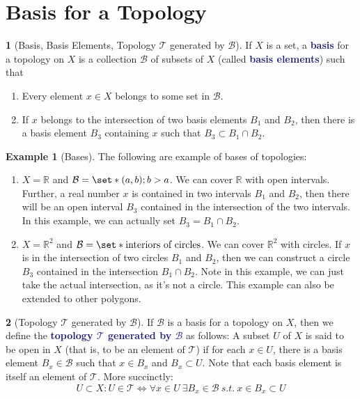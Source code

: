 \documentclass[11pt]{article}
\numberwithin{equation}{section}
\newcommand{\navy}[1]{\textcolor{MidnightBlue}{\bf #1}}
\theoremstyle{plain}
\theoremstyle{definition}
\newtheorem{definition}{\color{MidnightBlue}{\textbf{Definition}}}[section]
\newtheorem{example}{\color{WildStrawberry}Example}[section]
\def\Set{\set*}%
\def\ss{\subset}
\newcommand{\1}{\mathbbm 1}
\newcommand{\RR}{\mathbb R}
\newcommand{\tT}{\mathcal T}
\newcommand{\bB}{\mathcal B}
\begin{document}
\section{Basis for a Topology}

\begin{definition}[Basis, Basis Elements, Topology $\tT$ generated by $\bB$]
	If $X$ is a set, a \navy{basis} for a topology on $X$ is a collection $\bB$ of subsets of $X$ (called \navy{basis elements}) such that
	\begin{enumerate}
		\item Every element $x \in X$ belongs to some set in $\bB$. 
		\item If $x$ belongs to the intersection of two basis elements $B_1$ and $B_2$, then there is a basis element $B_3$ containing $x$ such that $B_3 \subset B_1 \cap B_2$.
	\end{enumerate}
\end{definition}

\begin{example}[Bases] The following are example of bases of topologies:
	\begin{enumerate}
		\item $X = \RR$ and $\bB = \Set{(a,b);b>a}$. We can cover $\RR$ with open intervals. Further, a real number $x$ is contained in two intervals $B_1$ and $B_2$, then there will be an open interval $B_3$ contained in the intersection of the two intervals. In this example, we can actually set $B_3 = B_1 \cap B_2$. 
		\item $X = \RR^2$ and $\bB = \Set{\text{interiors of circles}}$. We can cover $\RR^2$ with circles. If $x$ is in the intersection of two circles $B_1$ and $B_2$, then we can construct a circle $B_3$ contained in the intersection $B_1 \cap B_2$. Note in this example, we can just take the actual intersection, as it's not a circle. This example can also be extended to other polygons. 
	\end{enumerate}
\end{example}


\begin{definition}[Topology $\tT$ generated by $\bB$]
	If $\bB$ is a basis for a topology on $X$, then we define the \navy{topology $\tT$ generated by $\bB$} as follows: A subset $U$ of $X$ is said to be open in $X$ (that is, to be an element of $\tT$) if for each $x \in U$, there is a basis element $B_x \in \bB$ such that $x \in B_x$ and $B_x \subset U$. Note that each basis element is itself an element of $\tT$. More succinctly:
	\begin{equation*}
		U \ss X: U \in \tT \iff \forall x\in U \ \exists B_x \in \bB \ s.t. \ x \in B_x \ss U
	\end{equation*}
	
\end{definition}
\end{document}
